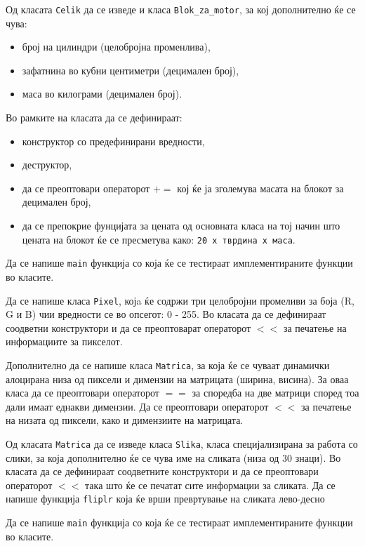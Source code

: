 \documentclass[12pt,a4paper]{exam}
\begin{document}
\begin{questions}
Од класата \texttt{Celik} да се изведе и класа \texttt{Blok\_za\_motor}, за кој
дополнително ќе се чува:
\begin{itemize}
  \item број на цилиндри (целобројна променлива),
  \item зафатнина во кубни центиметри (децимален број),
  \item маса во килограми (децимален број).
\end{itemize}
Во рамките на класата да се дефинираат:
\begin{itemize}
  \item конструктор со предефинирани вредности,
  \item деструктор,
  \item да се преоптовари операторот $+=$ кој ќе ја зголемува масата на блокот
за децимален број,
\item да се препокрие фунцијата за цената од основната класа на тој начин
што цената на блокот ќе се пресметува како: \texttt{20 x тврдина x маса}.
\end{itemize}

Да се напише \texttt{main} функција со која ќе се тестираат имплементираните
функции во класите.

\question
Да се напише класа \texttt{Pixel}, којa ќе содржи три целобројни промеливи за
боја (R, G и B) чии вредности се во опсегот: 0 - 255.
Во класата да се дефинираат соодветни конструктори и да се преоптоварат
операторот $<<$ за печатење на информациите за пикселот.

Дополнително да се напише класа \texttt{Matrica}, за која ќе се чуваат динамички
алоцирана низа од пиксели и димензии на матрицата (ширина, висина).
За оваа класа да се преоптовари операторот $==$ за споредба на две матрици според
тоа дали имаат еднакви димензии. Да се преоптовари операторот $<<$ за печатење
на низата од пиксели, како и димензиите на матрицата.

Од класата \texttt{Matrica} да се изведе класа \texttt{Slika}, класа
специјализирана за работа со слики, за која дополнително ќе се чува име на
сликата (низа од 30 знаци). Во класата да се дефинираат соодветните конструктори
и да се преоптовари операторот $<<$ така што ќе се печатат сите информации за
сликата.
Да се напише функција \texttt{fliplr} која ќе врши превртување на сликата
лево-десно 

Да се напише \texttt{main} функција со која ќе се тестираат имплементираните функции во класите.

\end{questions}
\end{document}
